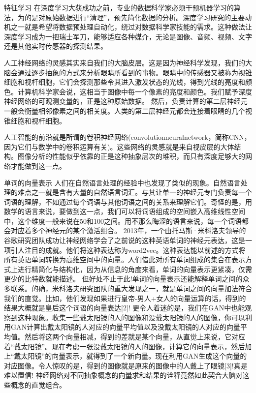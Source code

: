 特征学习
在深度学习大获成功之前，专业的数据科学家必须干预机器学习的算法，为的是对原始数据进行“清理”，预先简化数据的分析。深度学习研究的主要动机之一就是希望将数据预处理自动化，绕过对数据科学家技能的需求。这种做法让深度学习成为一把瑞士军刀，能够适应各种媒介，无论是图像、音频、视频、文字还是其他实时传感器的探测结果。

人工神经网络的灵感其实来自我们的大脑皮层。这是因为神经科学发现，我们的大脑会通过逐步抽象的方式来分析眼睛所看到的事物。眼睛中的传感器又被称为视锥细胞和视杆细胞，它们会探测那些令其进入激发状态的光线，得到光线的亮度和颜色。计算机科学家会说，这相当于图像中每一个像素的亮度和颜色。我们赋予深度神经网络的可观测变量的，正是这种原始数据。
然后，负责计算的第二层神经元一般会衡量相邻像素之间的相关度。人类的第二层神经元都会连接着眼睛的几个视锥细胞和视杆细胞。

人工智能的前沿就是所谓的卷积神经网络(convolutionneuralnetwork，简称CNN，因为它们与数学中的卷积运算有关)。这些网络的灵感就是来自视皮层的大体结构。图像分析的性能似乎依靠的正是这种抽象层次的堆积，而只有深度足够大的网络才能做到这一点。

单词的向量表示
人们在自然语言处理的经验中也发现了类似的现象。自然语言处理的难点之一就是含有大量的自然语言词汇。与其让单一的神经元专门负责每一个词语的理解，不如通过每个词语与其他词语之间的关系来理解它们。奇怪的是，用数学的语言来说，要做到这一点，我们可以将词语组成的空间嵌入高维线性空间中，这个维度一般来说在50和100之间。用不那么晦涩的语言来说，每一个词语都会对应着多个神经元的某个激活组合。
2013年，一个由托马斯·米科洛夫领导的谷歌研究团队成功让神经网络学会了之前说的这种英语单词的神经元表达，这是一项引人注目的成就。他们将这种表达称为word2vec。这种表达能以前述的方式将所有英语单词转换为高维空间中的向量。人们借此对所有单词组成的集合在表示方式上进行精简化与结构化，因为从信息的角度来看，单词的向量表示更紧凑，仅需更少的比特数就能描述。
但好处不止于此!单词的向量表示还能解释单词之间的众多联系。的确，米科洛夫研究团队的重大发现之一，就是单词之间的向量加法符合我们的直觉。比如，他们发现如果进行皇帝-男人+女人的向量运算的话，得到的结果大概就是皇后这个词语的向量表达[2]!
更令人着迷的是，我们在GAN中也能观察到这种现象。收集一些戴太阳镜的人的图像和没戴太阳镜的人的图像，你可以利用GAN计算出戴太阳镜的人对应的向量平均值以及没戴太阳镜的人对应的向量平均值。然后将这两个向量相减，得到的差就是某个向量，从直觉上来说，它对应着“戴太阳镜”。现在考虑一张没戴太阳镜的人的图像，计算它的向量表示，然后加上“戴太阳镜”的向量表示，就得到了一个新向量。现在利用GAN生成这个向量的对应图像。令人惊叹的是，得到的图像就是原来的图像中的人戴上了眼镜[3]!真是难以置信!
神经网络对不同抽象概念的向量求和结果的诠释竟然如此契合大脑对这些概念的直觉组合。



